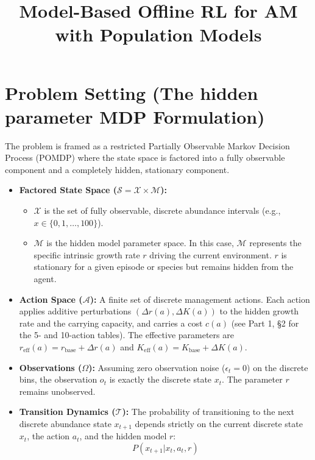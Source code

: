 \documentclass[11pt]{article}
\title{Model-Based Offline RL for AM with Population Models}
\begin{document}
\maketitle

\section{Problem Setting (The hidden parameter MDP Formulation)}
The problem is framed as a restricted Partially Observable Markov Decision Process (POMDP) where the state space is factored into a fully observable component and a completely hidden, stationary component.

\begin{itemize}
    \item \textbf{Factored State Space ($\mathcal{S} = \mathcal{X} \times \mathcal{M}$):}
    \begin{itemize}
        \item $\mathcal{X}$ is the set of fully observable, discrete abundance intervals (e.g., $x \in \{0, 1, \dots, 100\}$).
        \item $\mathcal{M}$ is the hidden model parameter space. In this case, $\mathcal{M}$ represents the specific intrinsic growth rate $r$ driving the current environment. $r$ is stationary for a given episode or species but remains hidden from the agent.
    \end{itemize}
    
    \item \textbf{Action Space ($\mathcal{A}$):} A finite set of discrete management actions. Each action applies additive perturbations $(\Delta r(a), \Delta K(a))$ to the hidden growth rate and the carrying capacity, and carries a cost $c(a)$ (see Part 1, \S2 for the 5- and 10-action tables). The effective parameters are $r_{\mathrm{eff}}(a) = r_{\mathrm{base}} + \Delta r(a)$ and $K_{\mathrm{eff}}(a) = K_{\mathrm{base}} + \Delta K(a)$.
    
    \item \textbf{Observations ($\Omega$):} Assuming zero observation noise ($\epsilon_t = 0$) on the discrete bins, the observation $o_t$ is exactly the discrete state $x_t$. The parameter $r$ remains unobserved.
    
    \item \textbf{Transition Dynamics ($\mathcal{T}$):} The probability of transitioning to the next discrete abundance state $x_{t+1}$ depends strictly on the current discrete state $x_t$, the action $a_t$, and the hidden model $r$: 
    $$P(x_{t+1} | x_t, a_t, r)$$
\end{itemize}
\end{document}
